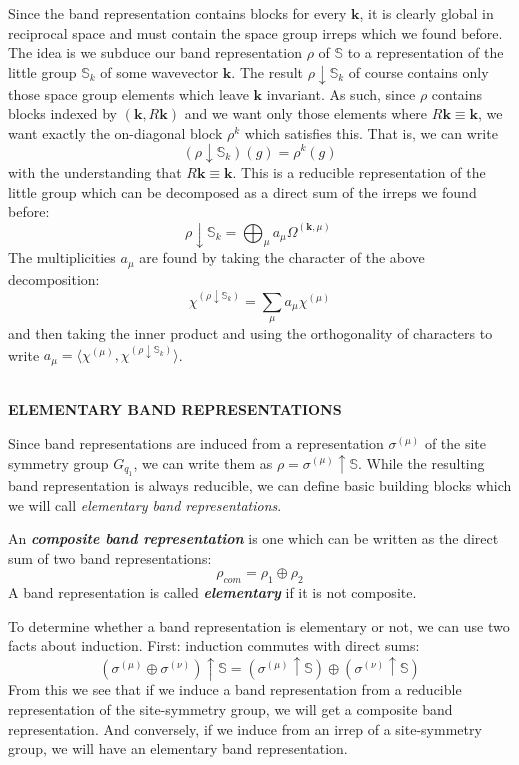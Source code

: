 \documentclass[9 pt]{report}
\def\*#1{\boldsymbol{#1}}
\begin{document}
\noindent Since the band representation contains blocks for every $\*k$, it is clearly global in reciprocal space and must contain the space group irreps which we found before. The idea is we subduce our band representation $\rho$ of $\mathbb{S}$ to a representation of the little group $\mathbb{S}_k$ of some wavevector $\*k$. The result $\rho\downarrow \mathbb{S}_k$ of course contains only those space group elements which leave $\*k$ invariant. As such, since $\rho$ contains blocks indexed by $(\*k, R\*k)$ and we want only those elements where $R\*k\equiv\*k$, we want exactly the on-diagonal block $\rho^k$ which satisfies this. That is, we can write
$$ (\rho\downarrow \mathbb{S}_k)(g) = \rho^k(g) $$
with the understanding that $R\*k\equiv \*k$. This is a reducible representation of the little group which can be decomposed as a direct sum of the irreps we found before: 
$$ \rho\downarrow \mathbb{S}_k = \bigoplus_\mu a_\mu \Omega^{(\*k,\mu)} \ $$
The multiplicities $a_\mu$ are found by taking the character of the above decomposition:
$$ \chi^{(\rho\downarrow\mathbb{S}_k)} = \sum_{\mu}a_\mu \chi^{(\mu)} $$
and then taking the inner product and using the orthogonality of characters to write $ a_\mu = \langle \chi^{(\mu)}, \chi^{(\rho\downarrow\mathbb{S}_k)}\rangle $. 
\\
\\

\begin{center}
	\textbf{ELEMENTARY BAND REPRESENTATIONS}
\end{center}

\noindent Since band representations are induced from a representation $\sigma^{(\mu)}$ of the site symmetry group $G_{q_1}$, we can write them as $\rho = \sigma^{(\mu)}\uparrow \mathbb{S}$. While the resulting band representation is always reducible, we can define basic building blocks which we will call \emph{elementary band representations}.

\begin{tcolorbox}
	An \textbf{\emph{composite band representation}} is one which can be written as the direct sum of two band representations: 
	$$ \rho_{com} = \rho_1 \oplus \rho_2 $$
	A band representation is called \textbf{\emph{elementary}} if it is not composite.
\end{tcolorbox}

\noindent To determine whether a band representation is elementary or not, we can use two facts about induction. First: induction commutes with direct sums:
$$ (\sigma^{(\mu)} \oplus \sigma^{(\nu)})\uparrow \mathbb{S} = (\sigma^{(\mu)} \uparrow\mathbb{S})\oplus (\sigma^{(\nu)} \uparrow \mathbb{S}) $$
From this we see that if we induce a band representation from a reducible representation of the site-symmetry group, we will get a composite band representation. And conversely, if we induce from an irrep of a site-symmetry group, we will have an elementary band representation. 
\end{document}
